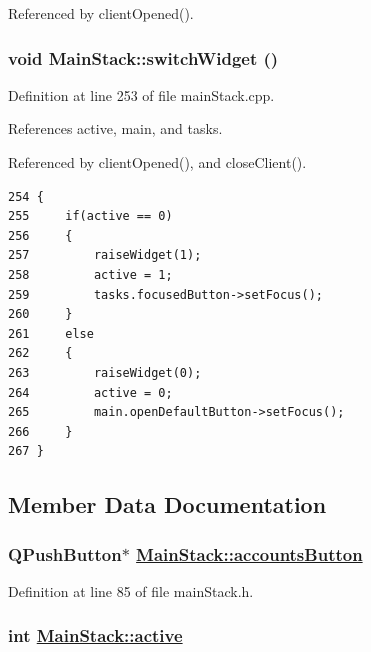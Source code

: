 Referenced by client\-Opened().\hypertarget{classMainStack_d1}{
\subsubsection[switchWidget]{\setlength{\rightskip}{0pt plus 5cm}void Main\-Stack::switch\-Widget ()}}
\label{classMainStack_d1}


Definition at line 253 of file main\-Stack.cpp.

References active, main, and tasks.

Referenced by client\-Opened(), and close\-Client().

\footnotesize\begin{verbatim}254 {
255     if(active == 0)
256     {
257         raiseWidget(1);
258         active = 1;
259         tasks.focusedButton->setFocus();
260     }
261     else
262     {
263         raiseWidget(0);
264         active = 0;
265         main.openDefaultButton->setFocus();
266     }
267 }
\end{verbatim}\normalsize 




\subsection{Member Data Documentation}
\hypertarget{classMainStack_r26}{
\subsubsection[accountsButton]{\setlength{\rightskip}{0pt plus 5cm}QPush\-Button$\ast$ \hyperlink{classMainStack_r26}{Main\-Stack::accounts\-Button}}}
\label{classMainStack_r26}


Definition at line 85 of file main\-Stack.h.\hypertarget{classMainStack_r5}{
\subsubsection[active]{\setlength{\rightskip}{0pt plus 5cm}int \hyperlink{classMainStack_r5}{Main\-Stack::active}}}
\label{classMainStack_r5}


